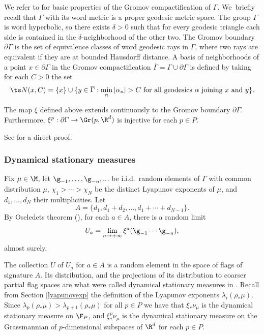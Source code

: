 We refer to \cite[Chap.\,7]{GdlH90} for basic properties of the Gromov compactification of \(\Gamma\). We~briefly recall that \(\Gamma\) with its word metric is a proper geodesic metric space.
The group \(\Gamma\) is word hyperbolic, so there exists \(\delta > 0\) such that for every geodesic triangle each side is contained in the \(\delta\)-neighborhood of the other two.
The Gromov boundary \(\partial \Gamma\) is the set of equivalence classes of word geodesic rays in \(\Gamma\), where two rays are equivalent if they are at bounded Hausdorff distance.
A basis of neighborhoods of a point \(x \in \partial \Gamma\) in the Gromov compactification \(\overline{\Gamma} = \Gamma \cup \partial \Gamma\) is defined by taking for each \(C > 0\) the set
\[
\ts N(x,C) = \lbrace x\rbrace \cup \lbrace y \in \overline{\Gamma}: \min_{n} |\alpha_n| > C\text{ for all geodesics }\alpha\text{ joining }x\text{ and }y\rbrace.
\]

\begin{proposition}\label{boundarymapstheorem}
The map \(\xi\) defined above extends continuously to the Gromov boundary \(\partial \Gamma\). Furthermore, \(\xi^p:\partial\Gamma \to \Gr(p,\R^d)\) is injective for each \(p \in P\).
\end{proposition}

See \cite[Prop.\,30.3]{canary} for a direct proof.

\subsubsection{Dynamical stationary measures}

Fix \(\mu \in \M\), let \(\g_{-1},\ldots, \g_{-n},..\). be i.i.d.\ random elements of \(\Gamma\) with common distribution \(\mu\), \(\chi_1 > \cdots > \chi_N\) be the distinct Lyapunov exponents of \(\mu\), and \(d_1,\ldots, d_N\) their multiplicities.
Let
\[
A = \lbrace d_1, d_1+d_2,\ldots, d_1+\cdots + d_{N-1} \rbrace.
\]
By Oseledets theorem (\cite{Ose68}), for each \(a \in A\), there is a random limit
\[
U_a = \lim_{n \to +\infty} \xi^a(\g_{-1}\cdots \g_{-n}),
\]
almost surely.

The collection \(U\) of \(U_a\) for \(a \in A\) is a random element in the space of flags of signature \(A\). Its distribution, and the projections of its distribution to coarser partial flag spaces are what were called dynamical stationary measures in \cite{LL23}. Recall from Section \ref{lyapunovexp} the definition of the Lyapunov exponents \(\lambda_i(\rho_*\mu)\). Since \(\lambda_p(\rho_*\mu) > \lambda_{p+1}(\rho_*\mu)\) for all \(p \in P\) we have that \(\xi_*\nu_\mu\) is the dynamical stationary measure on \(\F_P\), and \(\xi^p_*\nu_\mu\) is the dynamical stationary measure on the Grassmannian of \(p\)-dimensional subspaces of \(\R^d\) for each \(p \in P\).

